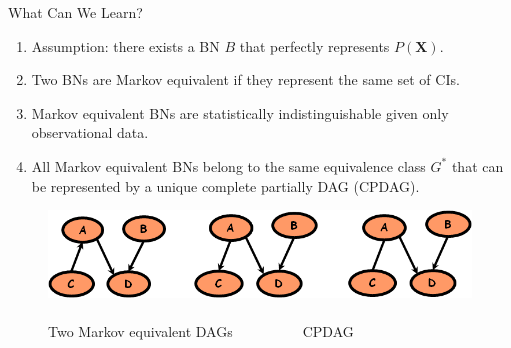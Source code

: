 \documentclass[hyperref={pdfpagelabels=false}]{beamer}
\begin{document}
\begin{frame}{What Can We Learn?}	
	\begin{enumerate}\small
		\item Assumption: there exists a BN $B$ that \alert{perfectly} represents $P(\mathbf{X})$.
		\item Two BNs are \alert{Markov equivalent} if they represent the same set of CIs.
		\item  Markov equivalent BNs are \alert{statistically indistinguishable} given only observational data.
		\item All Markov equivalent BNs belong to the same \alert{equivalence class} $G^*$ that can be represented by a unique complete partially DAG (CPDAG).
	\end{enumerate}
	\begin{figure}[h]
		\begin{center}
			\includegraphics[scale = .6]{figures/markovequiv.png}~\\
			{\small Two Markov equivalent DAGs~~~~~~~~~~CPDAG}
		\end{center}
	\end{figure}			
\end{frame}
\end{document}
